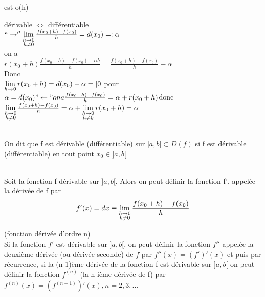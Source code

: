 \documentclass[12pt,a4paper]{article}
\begin{document}
{\begin{boite}
 est o(h)
\end{boite}
 dérivable $\iff$ différentiable\\
$``\to'' \lim\limits_{\substack{h \to 0 \\ h \neq 0}} \frac{f(x_0 + h) - f(x_0)}{h} = d(x_0) =:\alpha$\\
on a\\
$r(x_0 + h)  \frac{f(x_0 + h) - f(x_0) - \alpha h}{h} = \frac{f(x_0 + h) - f(x_0)}{h} - \alpha$\\
Donc\\
$\lim\limits_{h \to 0} r(x_0 + h) = d(x_0) - \alpha =| 0$ pour $\alpha = d(x_0)\\
"\leftarrow" on a \frac{f(x_0 + h) - f(x_0)}{h} = \alpha + r(x_0+h)\\
$donc $\lim\limits_{\substack{h \to 0 \\ h \neq 0}} \frac{f(x_0 + h) - f(x_0)}{h} = \alpha + \lim\limits_{\substack{h \to 0 \\ h \neq 0}} r(x_0 + h) = \alpha$
\begin{boite}
\Definition \\
On dit que f est dérivable (différentiable) sur $]a,b[ \subset D(f)$ si f est dérivable (différentiable) en tout point $x_0 \in ]a,b[$
\end{boite}

\begin{boite}
\Definition \\
Soit la fonction f dérivable sur $]a,b[$. Alors on peut définir la fonction f', appelée la dérivée de f par 
\begin{equation}
f'(x) = dx \equiv \lim\limits_{\substack{h \to 0 \\ h \neq 0}} \frac{f(x_0 + h) - f(x_0)}{h}
\end{equation}
\end{boite}

\begin{boite}
\Definition (fonction dérivée d'ordre n)\\ 
Si la fonction $f'$ est dérivable sur $]a,b[$, on peut définir la fonction $f''$ appelée la deuxième dérivée (ou dérivée seconde) de $f$ par $f''(x) = (f')'(x)$ et puis par récurrence, si la (n-1)ème dérivée de la fonction f est dérivable sur $]a,b[$ on peut définir la fonction $f^{(n)}$ (la n-ième dérivée de f) par $f^{(n)}(x) = (f^{(n-1)})'(x), n = 2,3,... $
\end{boite}
}
\end{document}
